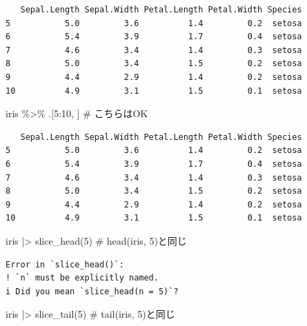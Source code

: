 \documentclass[
  letterpaper,
  DIV=11,
  numbers=noendperiod]{scrreprt}
\newenvironment{Shaded}{\begin{snugshade}}{\end{snugshade}}
\newcommand{\CommentTok}[1]{\textcolor[rgb]{0.37,0.37,0.37}{#1}}
\newcommand{\DecValTok}[1]{\textcolor[rgb]{0.68,0.00,0.00}{#1}}
\newcommand{\FunctionTok}[1]{\textcolor[rgb]{0.28,0.35,0.67}{#1}}
\newcommand{\NormalTok}[1]{\textcolor[rgb]{0.00,0.23,0.31}{#1}}
\newcommand{\SpecialCharTok}[1]{\textcolor[rgb]{0.37,0.37,0.37}{#1}}
\begin{document}
\begin{verbatim}
   Sepal.Length Sepal.Width Petal.Length Petal.Width Species
5           5.0         3.6          1.4         0.2  setosa
6           5.4         3.9          1.7         0.4  setosa
7           4.6         3.4          1.4         0.3  setosa
8           5.0         3.4          1.5         0.2  setosa
9           4.4         2.9          1.4         0.2  setosa
10          4.9         3.1          1.5         0.1  setosa
\end{verbatim}

\begin{Shaded}
\begin{Highlighting}[]
\NormalTok{iris }\SpecialCharTok{\%\textgreater{}\%}\NormalTok{ .[}\DecValTok{5}\SpecialCharTok{:}\DecValTok{10}\NormalTok{, ] }\CommentTok{\# こちらはOK}
\end{Highlighting}
\end{Shaded}

\begin{verbatim}
   Sepal.Length Sepal.Width Petal.Length Petal.Width Species
5           5.0         3.6          1.4         0.2  setosa
6           5.4         3.9          1.7         0.4  setosa
7           4.6         3.4          1.4         0.3  setosa
8           5.0         3.4          1.5         0.2  setosa
9           4.4         2.9          1.4         0.2  setosa
10          4.9         3.1          1.5         0.1  setosa
\end{verbatim}

\begin{Shaded}
\begin{Highlighting}[]
\NormalTok{iris }\SpecialCharTok{|\textgreater{}} \FunctionTok{slice\_head}\NormalTok{(}\DecValTok{5}\NormalTok{) }\CommentTok{\# head(iris, 5)と同じ}
\end{Highlighting}
\end{Shaded}

\begin{verbatim}
Error in `slice_head()`:
! `n` must be explicitly named.
i Did you mean `slice_head(n = 5)`?
\end{verbatim}

\begin{Shaded}
\begin{Highlighting}[]
\NormalTok{iris }\SpecialCharTok{|\textgreater{}} \FunctionTok{slice\_tail}\NormalTok{(}\DecValTok{5}\NormalTok{) }\CommentTok{\# tail(iris, 5)と同じ}
\end{Highlighting}
\end{Shaded}
\end{document}
